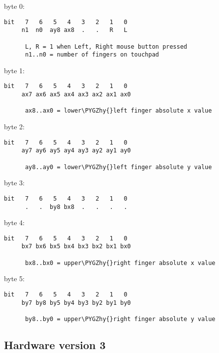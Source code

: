 \documentclass[a4paper,8pt,english]{sphinxmanual}
\def\PYGZhy{\char`\-}
\begin{document}
byte 0:

\begin{Verbatim}[commandchars=\\\{\}]
bit   7   6   5   4   3   2   1   0
     n1  n0  ay8 ax8  .   .   R   L

      L, R = 1 when Left, Right mouse button pressed
      n1..n0 = number of fingers on touchpad
\end{Verbatim}

byte 1:

\begin{Verbatim}[commandchars=\\\{\}]
bit   7   6   5   4   3   2   1   0
     ax7 ax6 ax5 ax4 ax3 ax2 ax1 ax0

      ax8..ax0 = lower\PYGZhy{}left finger absolute x value
\end{Verbatim}

byte 2:

\begin{Verbatim}[commandchars=\\\{\}]
bit   7   6   5   4   3   2   1   0
     ay7 ay6 ay5 ay4 ay3 ay2 ay1 ay0

      ay8..ay0 = lower\PYGZhy{}left finger absolute y value
\end{Verbatim}

byte 3:

\begin{Verbatim}[commandchars=\\\{\}]
bit   7   6   5   4   3   2   1   0
      .   .  by8 bx8  .   .   .   .
\end{Verbatim}

byte 4:

\begin{Verbatim}[commandchars=\\\{\}]
bit   7   6   5   4   3   2   1   0
     bx7 bx6 bx5 bx4 bx3 bx2 bx1 bx0

      bx8..bx0 = upper\PYGZhy{}right finger absolute x value
\end{Verbatim}

byte 5:

\begin{Verbatim}[commandchars=\\\{\}]
bit   7   6   5   4   3   2   1   0
     by7 by8 by5 by4 by3 by2 by1 by0

      by8..by0 = upper\PYGZhy{}right finger absolute y value
\end{Verbatim}


\subsection{Hardware version 3}
\label{input/devices/elantech:hardware-version-3}
\end{document}

